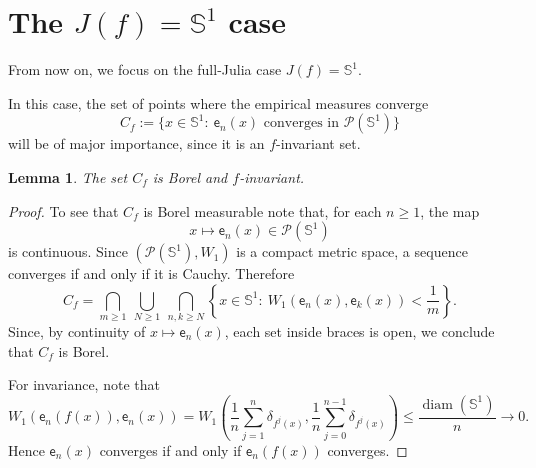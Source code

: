 \documentclass[12pt,a4paper,twoside]{article}
\theoremstyle{plain}
\newtheorem{lemma}[theorem]{Lemma}
\theoremstyle{definition}
\newcommand{\cP}{{\mathcal P}}
\newcommand{\Lip}{\textrm{Lip}}
\newcommand{\emp}{\mathsf e}
\newcommand{\Wone}{W_1}
\newcommand{\diam}{\operatorname{diam}}
\newcommand{\Sone}{\mathbb{S}^1}
\begin{document}

\section{The \texorpdfstring{$J(f)=\Sone$}{J(f)=S1} case}
	
	From now on, we focus on the full-Julia case \(J(f)=\Sone\).
	
	In this case, the set of points where the empirical measures converge
	\[
	C_{f}:=\{x\in \Sone:\ \emp_n(x)\text{ converges in }\cP(\Sone)\}
	\]
	will be of major importance, since it is an $f$-invariant set.
	
	
	\begin{lemma}\label{lem:C-invariant}
		The set $C_{f}$ is Borel and $f$-invariant.
	\end{lemma}
	
	\begin{proof}
		To see that $C_{f}$ is Borel measurable note that, for each \(n\ge1\), the map
	\[
	x\longmapsto \emp_n(x)\in \cP(\Sone)
	\]
	is continuous. Since \((\cP(\Sone),\Wone)\) is a compact metric space, a sequence
	converges if and only if it is Cauchy. Therefore
	\[
	C_{f}=
	\bigcap_{m\ge1}\ \bigcup_{N\ge1}\ \bigcap_{n,k\ge N}
	\left\{x\in \Sone:\ \Wone(\emp_n(x),\emp_k(x))<\frac1m\right\}.
	\]
	Since, by continuity of \(x\mapsto \emp_n(x)\), each set inside braces is open, we conclude that \(C_{f}\) is Borel.
	
		For invariance, note that
		\[
		\Wone(\emp_n(f(x)),\emp_n(x))
		=
		\Wone\!\left(
		\frac1n\sum_{j=1}^{n}\delta_{f^j(x)},
		\frac1n\sum_{j=0}^{n-1}\delta_{f^j(x)}
		\right)
		\le
		\frac{\diam(\Sone)}{n}\to0.
		\]
		Hence $\emp_n(x)$ converges if and only if $\emp_n(f(x))$ converges.
	\end{proof}
	
\end{document}
